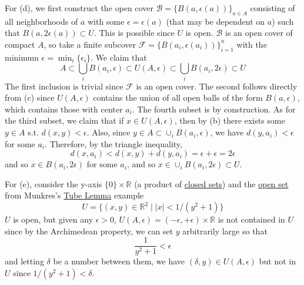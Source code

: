 \begin{solution}
    For (d), we first construct the open cover $\mathscr{B} = \{B(a, \epsilon(a))\}_{a \in A}$ consisting of all neighborhoods of $a$ with some $\epsilon = \epsilon(a)$ (that may be dependent on $a$) such that $B(a, 2\epsilon(a)) \subset U$. This is possible since $U$ is open. $\mathscr{B}$ is an open cover of compact $A$, so take a finite subcover $\mathscr{F} = \{B(a_i, \epsilon(a_i))\}_{i=1}^n$ with the minimum $\epsilon = \min_i \{\epsilon_i\}$. We claim that 
    \begin{equation}
      A \subset \bigcup_i B(a_i, \epsilon) \subset U(A, \epsilon) \subset \bigcup_i B(a_i, 2\epsilon) \subset U
    \end{equation} 
    The first inclusion is trivial since $\mathscr{F}$ is an open cover. The second follows directly from (c) since $U(A, \epsilon)$ contains the union of all open balls of the form $B(a, \epsilon)$, which contains those with center $a_i$. The fourth subset is by construction. As for the third subset, we claim that if $x \in U(A, \epsilon)$, then by (b) there exists some $y \in A$ s.t. $d(x, y) < \epsilon$. Also, since $y \in A \subset \cup_i B(a_i, \epsilon)$, we have $d(y, a_i) < \epsilon$ for some $a_i$. Therefore, by the triangle inequality, 
    \begin{equation}
      d(x, a_i) <  d(x, y) + d(y, a_i) = \epsilon + \epsilon = 2\epsilon  
    \end{equation}
    and so $x \in B(a_i, 2\epsilon)$ for some $a_i$, and so $x \in \cup_i B(a_i, 2\epsilon) \subset U$. 

    For (e), consider the y-axis $\{0\} \times \mathbb{R}$ (a product of \hyperref[def:closed]{closed sets}) and the \hyperref[def:open-set]{open set} from Munkres's \hyperref[thm:tube-lemma]{Tube Lemma} example
    \begin{equation}
      U = \{(x, y) \in \mathbb{R}^2 \mid |x| < 1/(y^2 + 1)\}
    \end{equation}
    $U$ is open, but given any $\epsilon > 0$, $U(A, \epsilon) = (-\epsilon, +\epsilon) \times \mathbb{R}$ is not contained in $U$ since by the Archimedean property, we can set $y$ arbitrarily large so that 
    \begin{equation}
      \frac{1}{y^2 + 1} < \epsilon
    \end{equation} 
    and letting $\delta$ be a number between them, we have $(\delta, y) \in U(A, \epsilon)$ but not in $U$ since $1/(y^2 + 1) < \delta$. 
  \end{solution}

